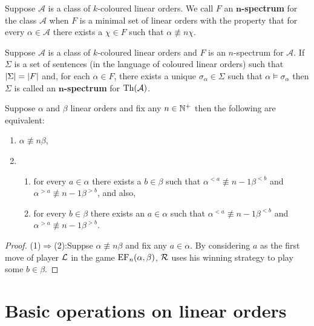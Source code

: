 \begin{dfn}[Spectrum]
	Suppose $\mathcal{A}$ is a class of $k$-coloured linear orders.  We call $F$ an $\mathbf{n}$\textbf{-spectrum} for the class $\mathcal{A}$ when $F$ is a minimal set of linear orders with the property that for every $\alpha\in\mathcal{A}$ there exists a $\chi\in F$ such that $\alpha\nequiv{n}\chi$.
\end{dfn}

\begin{dfn}
	Suppose $\mathcal{A}$ is a class of $k$-coloured linear orders and $F$ is an $n$-spectrum for $\mathcal{A}$.  If $\Sigma$ is a set of sentences (in the language of coloured linear orders) such that $\left\lvert\Sigma\right\rvert=\left\lvert F\right\rvert$ and, for each $\alpha\in F$, there exists a unique $\sigma_\alpha\in\Sigma$ such that $\alpha\models\sigma_\alpha$ then $\Sigma$ is called an $\mathbf{n}$\textbf{-spectrum} for $\operatorname{Th}(\mathcal{A})$.
\end{dfn}

\begin{lem}\label{lem:split}
	Suppose $\alpha$ and $\beta$ linear orders and fix any $n\in\mathbb{N}^{+}$ then the following are equivalent:
	\begin{enumerate}
		\item	$\alpha\nequiv{n}\beta$,
		\item	\begin{enumerate}
				\item	for every $a\in\alpha$ there exists a $b\in\beta$ such that $\alpha^{<a}\nequiv{n-1}\beta^{<b}$ and $\alpha^{>a}\nequiv{n-1}\beta^{>b}$, and also,
				\item	for every $b\in\beta$ there exists an $a\in\alpha$ such that $\alpha^{<a}\nequiv{n-1}\beta^{<b}$ and $\alpha^{>a}\nequiv{n-1}\beta^{>b}$.
			\end{enumerate}
	\end{enumerate}
\end{lem}
\begin{proof}
	\noindent(1)$\Rightarrow$(2):\quad 	Suppse $\alpha\nequiv{n}\beta$ and fix any $a\in\alpha$.  By considering $a$ as the first move of player $\mathcal{L}$ in the game $\operatorname{EF}_n(\alpha,\beta)$, $\mathcal{R}$ uses his winning strategy to play some $b\in\beta$.
\end{proof}


\section{Basic operations on linear orders}

